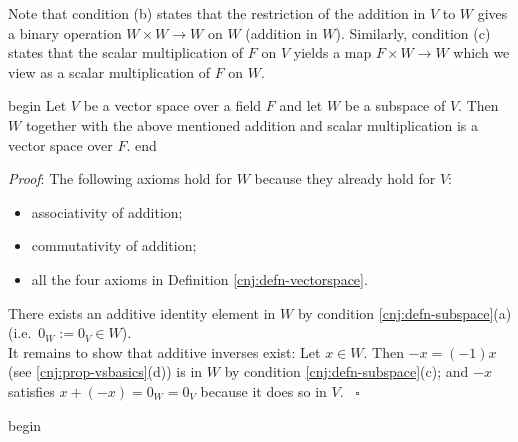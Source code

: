\documentclass[
  12pt,
  a4paper,
  twoside]{article}
\providecommand{\tightlist}{%
  \setlength{\itemsep}{0pt}\setlength{\parskip}{0pt}}
\theoremstyle{plain}
\theoremstyle{definition}
\begin{document}
Note that condition (b) states that the restriction of the addition in \(V\) to \(W\) gives a binary operation \(W \times W \to W\) on \(W\) (addition in \(W\)).
Similarly, condition (c) states that the scalar multiplication of \(F\) on \(V\) yields a map \(F \times W \to W\) which we view as a scalar multiplication of \(F\) on \(W\).

\csname begin\label{cnj:prop-subspace-is-VS}
Let \(V\) be a vector space over a field \(F\) and let \(W\) be a subspace of \(V\).
Then \(W\) together with the above mentioned addition and scalar multiplication is a vector space over \(F\).
\csname end

\emph{Proof}:
The following axioms hold for \(W\) because they already hold for \(V\):

\begin{itemize}
\tightlist
\item
  associativity of addition;
\item
  commutativity of addition;
\item
  all the four axioms in Definition \ref{cnj:defn-vectorspace}.
\end{itemize}

There exists an additive identity element in \(W\) by condition \ref{cnj:defn-subspace}(a) (i.e.~\(0_W:=0_V\in W\)).\\
It remains to show that additive inverses exist:
Let \(x \in W\). Then \(-x = (-1)x\) (see \ref{cnj:prop-vsbasics}(d)) is in \(W\) by condition \ref{cnj:defn-subspace}(c);
and \(-x\) satisfies \(x+(-x) = 0_W=0_V\) because it does so in \(V\).
\hfill~{\(\square\)}

\csname begin\label{cnj:expl-subspaces}
\end{document}
